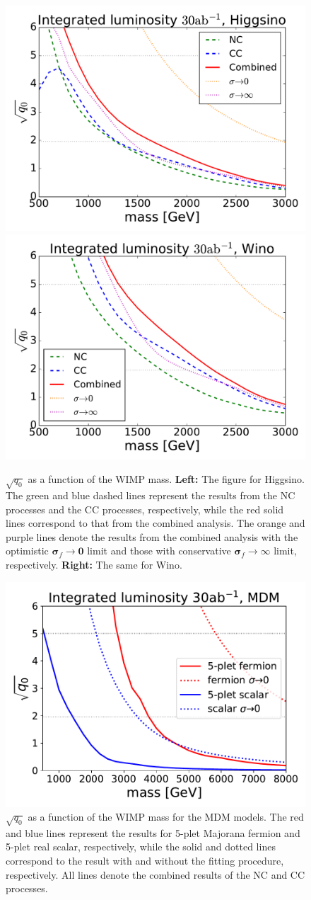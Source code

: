 \documentclass[12pt,twoside,book]{article}
\begin{document}
\begin{figure}[t]
  \centering
  \includegraphics[width=0.48\hsize]{mchi_vs_sqq0_Higgsino.pdf}
  \includegraphics[width=0.48\hsize]{mchi_vs_sqq0_Wino.pdf}
  \caption{
    $\sqrt{q_0}$ as a function of the WIMP mass.
    \textbf{Left:} The figure for Higgsino.
    The green and blue dashed lines represent the results from the NC processes and the CC processes, respectively, while the red solid lines correspond to that from the combined analysis.
    The orange and purple lines denote the results from the combined analysis with the optimistic $\bm{\sigma}_f \to \bm{0}$ limit and those with conservative $\bm{\sigma}_f \to \infty$ limit, respectively.
    \textbf{Right:} The same for Wino.
  }
  \label{fig_mchi_vs_sqq0}
\end{figure}

\begin{figure}[t]
  \centering
  \includegraphics[width=0.48\hsize]{mchi_vs_sqq0_MDM.pdf}
  \caption{
    $\sqrt{q_0}$ as a function of the WIMP mass for the MDM models.
    The red and blue lines represent the results for 5-plet Majorana fermion and 5-plet real scalar, respectively, while the solid and dotted lines correspond to the result with and without the fitting procedure, respectively.
    All lines denote the combined results of the NC and CC processes.
  }
  \label{fig:mchi_vs_sqq0_MDM}
\end{figure}
\end{document}
